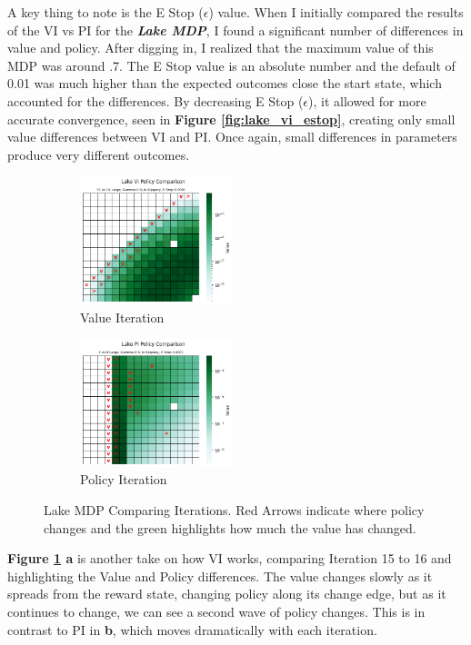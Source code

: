 \documentclass[letterpaper]{article} %
\begin{document}
A key thing to note is the E Stop ($\epsilon$) value.  When I initially compared the results of the VI vs PI for the \textbf{\emph{Lake MDP}}, I found a significant number of differences in value and policy.  After digging in, I realized that the maximum value of this MDP was around .7.  The E Stop value is an absolute number and the default of 0.01 was much higher than the expected outcomes close the start state, which accounted for the differences.  By decreasing E Stop ($\epsilon$), it allowed for more accurate convergence, seen in \textbf{Figure \ref{fig:lake_vi_estop}}, creating only small value differences between VI and PI.  Once again, small differences in parameters produce very different outcomes.  

\begin{figure}[!htb]
	\begin{subfigure}[b]{0.25\textwidth}
	\centering
		\includegraphics[width=1.75in]{Figures/Lake_VI_Policy_Comparison_15_vs_16_Large__Gamma_0_9__Is_Slippery__E_Stop_0_0001.png}
		\caption{Value Iteration}
  	\end{subfigure}%
	\begin{subfigure}[b]{0.25\textwidth}
	\centering
		\includegraphics[width=1.75in]{Figures/Lake_PI_Policy_Comparison_7_vs_8_Large__Gamma_0_9__Is_Slippery__E_Stop_0_0001.png}
		\caption{Policy Iteration}
  	\end{subfigure}%
\caption{Lake MDP Comparing Iterations.  Red Arrows indicate where policy changes and the green highlights how much the value has changed.}
\label{fig:lake_iteration_comparison}
\end{figure}

\textbf{Figure \ref{fig:lake_iteration_comparison} a} is another take on how VI works, comparing Iteration 15 to 16 and highlighting the Value and Policy differences.  The value changes slowly as it spreads from the reward state, changing policy along its change edge, but as it continues to change, we can see a second wave of policy changes.  This is in contrast to PI in \textbf{b}, which moves dramatically with each iteration. 
\end{document}
